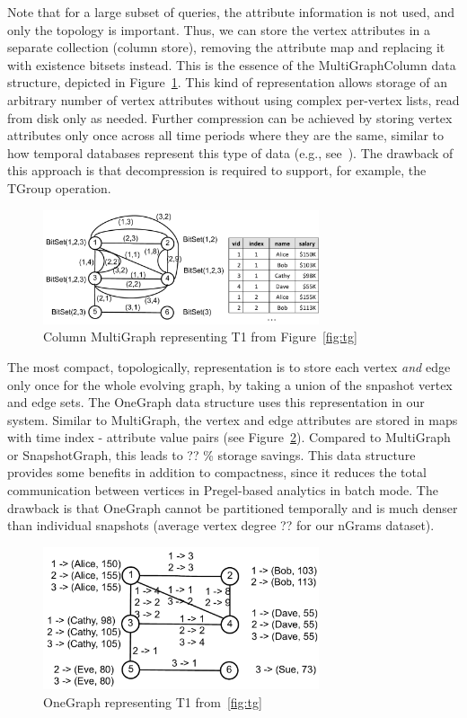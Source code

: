 Note that for a large subset of queries, the attribute information is
not used, and only the topology is important.  Thus, we can store the
vertex attributes in a separate collection (column store), removing
the attribute map and replacing it with existence bitsets instead.
This is the essence of the MultiGraphColumn data structure, depicted
in Figure~\ref{fig:mgc}.  This kind of representation allows storage
of an arbitrary number of vertex attributes without using complex
per-vertex lists, read from disk only as needed.  Further compression
can be achieved by storing vertex attributes only once across all time
periods where they are the same, similar to how temporal databases
represent this type of data (e.g., see~\cite{Muller2008}).  The
drawback of this approach is that decompression is required to
support, for example, the TGroup operation.

\begin{figure}[t!]
\includegraphics[width=3.2in]{figs/mgc.pdf}
\caption{Column MultiGraph representing T1 from Figure~\ref{fig:tg}}
\label{fig:mgc}
\end{figure}

The most compact, topologically, representation is to store each
vertex {\em and} edge only once for the whole evolving graph, by
taking a union of the snpashot vertex and edge sets.  The OneGraph
data structure uses this representation in our system.  Similar to
MultiGraph, the vertex and edge attributes are stored in maps with
time index - attribute value pairs (see Figure~\ref{fig:og}).
Compared to MultiGraph or SnapshotGraph, this leads to ?? \% storage
savings.  This data structure provides some benefits in addition to
compactness, since it reduces the total communication between vertices
in Pregel-based analytics in batch mode.  The drawback is that
OneGraph cannot be partitioned temporally and is much denser than
individual snapshots (average vertex degree ?? for our nGrams
dataset).

\begin{figure}[t!]
\includegraphics[width=3.2in]{figs/og.pdf}
\caption{OneGraph representing T1 from~\ref{fig:tg}}
\label{fig:og}
\end{figure}

